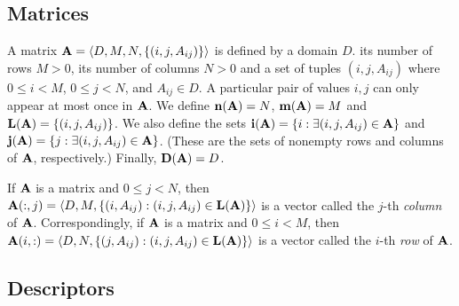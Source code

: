 \documentclass[11pt]{extarticle}
\begin{document}

\subsection{Matrices}
\label{Sec:Matrices}


A matrix ${\bf A} = \langle D, M, N,  \{ (i,j,A_{ij}) \} \rangle$ is
defined by a domain $D$. its number of rows $M>0$, its number of columns
$N>0$ and a set of tuples $(i,j,A_{ij})$ where $0 \leq i < M$, $0 \leq
j < N$, and $A_{ij} \in D$. A particular pair of values $i,j$ can only
appear at most once in ${\bf A}$. We define $\bold{n}({\bf A})
= N$,  $\bold{m}({\bf A}) = M$ and $\bold{L}({\bf A}) = \{
(i,j,A_{ij}) \}$.  We also define the sets ${\bf i({\bf A})} = \{
i : \exists (i,j,A_{ij}) \in {\bf A} \}$ and ${\bf j({\bf A})}
= \{ j : \exists (i,j,A_{ij}) \in {\bf A} \}$.  (These are the sets
of nonempty rows and columns of ${\bf A}$, respectively.)  Finally,
$\bold{D}({\bf A}) = D$.


If ${\bf A}$ is a matrix and $0 \leq j < N$, then ${\bf A}(:,j)
= \langle D, M, \{(i,A_{ij}) : (i,j,A_{ij}) \in \bold{L}({\bf A})
\} \rangle$ is a vector called the $j$-th \emph{column}
of ${\bf A}$. Correspondingly, if ${\bf A}$ is a matrix and
$0 \leq i < M$, then ${\bf A}(i,:) = \langle D, N, \{(j,A_{ij}) :
(i,j,A_{ij}) \in \bold{L}({\bf A}) \} \rangle$ is a vector called
the $i$-th \emph{row} of ${\bf A}$.

\subsection{Descriptors}

\end{document}

